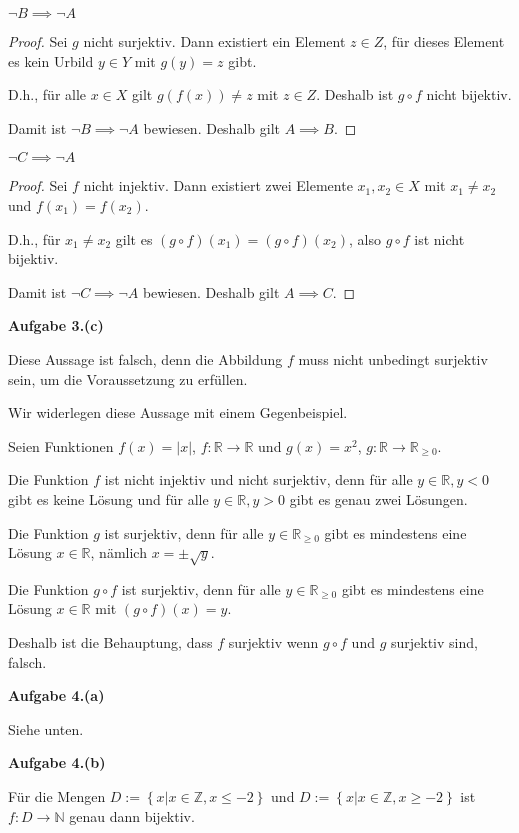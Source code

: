 \documentclass[12pt]{extarticle}
\begin{document}
\(\neg B \implies \neg A\)
\begin{proof}
  Sei \(g\) nicht surjektiv.  Dann existiert ein Element \(z \in Z\), für
  dieses Element es kein Urbild \(y \in Y\) mit \(g(y)=z\) gibt.

  D.h., für alle \(x \in X\) gilt \(g(f(x)) \neq z\) mit \(z \in Z\).  Deshalb
  ist \(g \circ f\) nicht bijektiv.

  Damit ist \(\neg B \implies \neg A\) bewiesen. Deshalb gilt \(A \implies B\).
\end{proof}

\(\neg C \implies \neg A\)
\begin{proof}
  Sei \(f\) nicht injektiv.  Dann existiert zwei Elemente \(x_1,x_2 \in X\)
  mit \(x_1 \neq x_2\) und \(f(x_1)=f(x_2)\).

  D.h., für \(x_1 \neq x_2\) gilt es \((g \circ f)(x_1)=(g \circ f)(x_2)\),
  also \(g \circ f\) ist nicht bijektiv.

  Damit ist \(\neg C \implies \neg A\) bewiesen. Deshalb gilt \(A \implies C\).
\end{proof}

\textbf{Aufgabe 3.(c)}

Diese Aussage ist falsch, denn die Abbildung \(f\) muss nicht
unbedingt surjektiv sein, um die Voraussetzung zu erfüllen.

Wir widerlegen diese Aussage mit einem Gegenbeispiel.

Seien Funktionen \(f(x)= \left| x \right|\),
\(f: \mathbb{R} \rightarrow \mathbb{R}\) und \(g(x) = x^2\),
\(g: \mathbb{R} \rightarrow \mathbb{R}_{\geq 0}\).

Die Funktion \(f\) ist nicht injektiv und nicht surjektiv, denn für alle
\(y \in \mathbb{R}, y < 0\) gibt es keine Lösung und für alle
\(y \in \mathbb{R}, y > 0\) gibt es genau zwei Lösungen.

Die Funktion \(g\) ist surjektiv, denn für alle
\(y \in \mathbb{R}_{\geq 0}\) gibt es mindestens eine Lösung
\(x \in \mathbb{R}\), nämlich \(x=\pm \sqrt{y}\).

Die Funktion \(g \circ f\) ist surjektiv, denn für alle
\(y \in \mathbb{R}_{\geq 0}\) gibt es mindestens eine
Lösung \(x \in \mathbb{R}\) mit
\((g \circ f)(x)= y\).

Deshalb ist die Behauptung, dass \(f\) surjektiv wenn \(g \circ f\) und
\(g\) surjektiv sind, falsch.

\textbf{Aufgabe 4.(a)}


Siehe unten.

\textbf{Aufgabe 4.(b)}


Für die Mengen \(D:=\left\{ x | x \in \mathbb{Z}, x \leq -2 \right\}\)
und \(D:=\left\{ x| x \in \mathbb{Z}, x \geq -2 \right\}\) ist $f: D
\rightarrow \mathbb{N}$ genau dann bijektiv.
\end{document}
